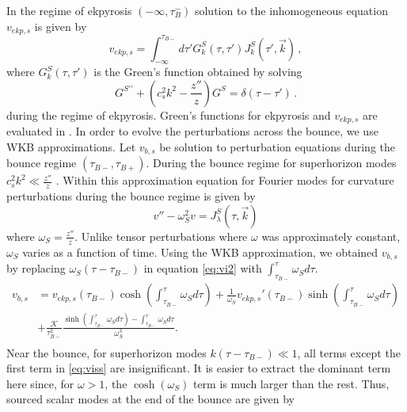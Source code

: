 \documentclass[12pt,a4paper]{article}
\numberwithin{equation}{section}
\numberwithin{equation}{section}
\begin{document}
In the regime of ekpyrosis $(-\infty,\tau_B^-)$ solution to the inhomogeneous equation $v_{ekp,s}$ 
is given by
\begin{equation}
v_{ekp,s} = \int_{-\infty}^{\tau_{B-}} d\tau' G^S_{k}(\tau,\tau') J^S_k (\tau',\Vec{k}) \, ,
\label{eq:vis} 
\end{equation}
where $G^S_k(\tau,\tau')$ is the Green's function obtained by solving
\begin{equation}
G^{S \prime \prime } + \left(c_s^2 k^2 - \frac{z''}{z}\right)G^S = \delta(\tau-\tau') \, .
\label{eq:greenfsg}
\end{equation}
during the regime of ekpyrosis. Green's functions for ekpyrosis and $v_{ekp,s}$ are evaluated in \cite{Artymowski:2020pci,r4}. In order to evolve the perturbations across the bounce, we use WKB approximations. Let $v_{b,s}$ be solution to perturbation equations during the bounce regime $(\tau_{B-},\tau_{B+})$. During the bounce regime for superhorizon modes $c_s^2 k^2 \ll \frac{z''}{z}$ \cite{Cai:2012va}. Within this approximation equation for Fourier modes for curvature perturbations during the bounce regime is given by
\begin{equation}
     v''-\omega_S^2 v =  J_{\lambda}^S (\tau,\Vec{k}) 
\end{equation}
where $\omega_S= \frac{z''}{z}$. Unlike tensor perturbations where $\omega$ was approximately constant, $\omega_S$ varies as a function of time. 
Using the WKB approximation, we obtained $v_{b,s}$ by replacing $\omega_S(\tau-\tau_{B-})$ in equation \eqref{eq:vi2} with $\int_{\tau_{B-}}^{\tau} \omega_S d\tau$. 
\begin{equation}
\begin{split}
v_{b,s} &= v_{ekp,s}(\tau_{B-}) \cosh\left(\int_{\tau_{B-}}^{\tau} \omega_S d\tau \right)+ \frac{1}{\omega_S} v_{ekp,s}'(\tau_{B-} ) \sinh\left(\int_{\tau_{B-}}^{\tau} \omega_S d\tau\right) \\
&+\frac{\mathcal{K}}{\tau^2_{B-}} \frac{\sinh\left(\int_{\tau_{B-}}^{\tau} \omega_S d\tau\right)-\int_{\tau_{B-}}^{\tau} \omega_S d\tau}{\omega_S^3}.\\
\label{eq:viss} 
\end{split}
\end{equation}
Near the bounce, for superhorizon modes $k(\tau-\tau_{B-})\ll 1$, all terms except the first term in \eqref{eq:viss} are insignificant.  It is easier to extract the dominant term here since, for $\omega>1$, the $\cosh(\omega_S)$ term is much larger than the rest. Thus, sourced scalar modes at the end of the bounce are given by
\end{document}
